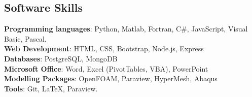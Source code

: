 \documentclass[line]{res}
\newenvironment{p11}
{\begin{adjustwidth}{-25pt}{0pt}
\vspace{8pt}}
{\end{adjustwidth}}
\begin{document}
\begin{resume}

\section{Software Skills}
\begin{p11}
\textbf{Programming languages}: Python, Matlab, Fortran, C\#,  JavaScript, Visual Basic, Pascal.\\
\textbf{Web Development}: HTML, CSS, Bootstrap, Node.js, Express\\
\textbf{Databases}: PostgreSQL, MongoDB\\
\textbf{Microsoft Office}:  Word, Excel (PivotTables, VBA), PowerPoint\\
\textbf{Modelling Packages}: OpenFOAM, Paraview, HyperMesh, Abaqus\\
\textbf{Tools}: Git, \LaTeX,  Paraview.\\
\vspace{4pt}
\end{p11}



\end{resume}
\end{document}
